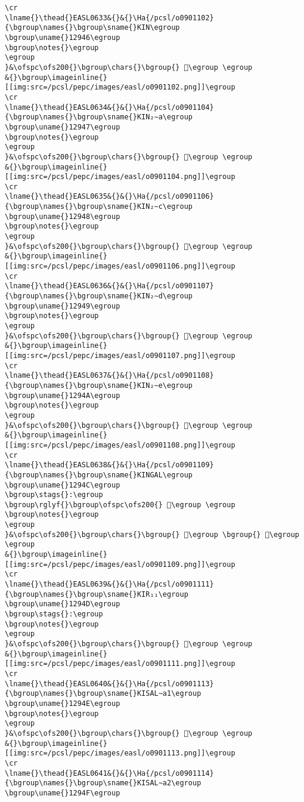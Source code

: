 \begin{verbatim}
\cr
\lname{}\thead{}EASL0633&{}&{}\Ha{/pcsl/o0901102}{\bgroup\names{}\bgroup\sname{}KIN\egroup
\bgroup\uname{}12946\egroup
\bgroup\notes{}\egroup
\egroup
}&\ofspc\ofs200{}\bgroup\chars{}\bgroup{} 𒥆\egroup \egroup
&{}\bgroup\imageinline{}[[img:src=/pcsl/pepc/images/easl/o0901102.png]]\egroup
\cr
\lname{}\thead{}EASL0634&{}&{}\Ha{/pcsl/o0901104}{\bgroup\names{}\bgroup\sname{}KIN₂∼a\egroup
\bgroup\uname{}12947\egroup
\bgroup\notes{}\egroup
\egroup
}&\ofspc\ofs200{}\bgroup\chars{}\bgroup{} 𒥇\egroup \egroup
&{}\bgroup\imageinline{}[[img:src=/pcsl/pepc/images/easl/o0901104.png]]\egroup
\cr
\lname{}\thead{}EASL0635&{}&{}\Ha{/pcsl/o0901106}{\bgroup\names{}\bgroup\sname{}KIN₂∼c\egroup
\bgroup\uname{}12948\egroup
\bgroup\notes{}\egroup
\egroup
}&\ofspc\ofs200{}\bgroup\chars{}\bgroup{} 𒥈\egroup \egroup
&{}\bgroup\imageinline{}[[img:src=/pcsl/pepc/images/easl/o0901106.png]]\egroup
\cr
\lname{}\thead{}EASL0636&{}&{}\Ha{/pcsl/o0901107}{\bgroup\names{}\bgroup\sname{}KIN₂∼d\egroup
\bgroup\uname{}12949\egroup
\bgroup\notes{}\egroup
\egroup
}&\ofspc\ofs200{}\bgroup\chars{}\bgroup{} 𒥉\egroup \egroup
&{}\bgroup\imageinline{}[[img:src=/pcsl/pepc/images/easl/o0901107.png]]\egroup
\cr
\lname{}\thead{}EASL0637&{}&{}\Ha{/pcsl/o0901108}{\bgroup\names{}\bgroup\sname{}KIN₂∼e\egroup
\bgroup\uname{}1294A\egroup
\bgroup\notes{}\egroup
\egroup
}&\ofspc\ofs200{}\bgroup\chars{}\bgroup{} 𒥊\egroup \egroup
&{}\bgroup\imageinline{}[[img:src=/pcsl/pepc/images/easl/o0901108.png]]\egroup
\cr
\lname{}\thead{}EASL0638&{}&{}\Ha{/pcsl/o0901109}{\bgroup\names{}\bgroup\sname{}KINGAL\egroup
\bgroup\uname{}1294C\egroup
\bgroup\stags{}:\egroup
\bgroup\rglyf{}\bgroup\ofspc\ofs200{} 𒥌\egroup \egroup
\bgroup\notes{}\egroup
\egroup
}&\ofspc\ofs200{}\bgroup\chars{}\bgroup{} 𒥋\egroup \bgroup{} 𒥌\egroup \egroup
&{}\bgroup\imageinline{}[[img:src=/pcsl/pepc/images/easl/o0901109.png]]\egroup
\cr
\lname{}\thead{}EASL0639&{}&{}\Ha{/pcsl/o0901111}{\bgroup\names{}\bgroup\sname{}KIR₁₁\egroup
\bgroup\uname{}1294D\egroup
\bgroup\stags{}:\egroup
\bgroup\notes{}\egroup
\egroup
}&\ofspc\ofs200{}\bgroup\chars{}\bgroup{} 𒥍\egroup \egroup
&{}\bgroup\imageinline{}[[img:src=/pcsl/pepc/images/easl/o0901111.png]]\egroup
\cr
\lname{}\thead{}EASL0640&{}&{}\Ha{/pcsl/o0901113}{\bgroup\names{}\bgroup\sname{}KISAL∼a1\egroup
\bgroup\uname{}1294E\egroup
\bgroup\notes{}\egroup
\egroup
}&\ofspc\ofs200{}\bgroup\chars{}\bgroup{} 𒥎\egroup \egroup
&{}\bgroup\imageinline{}[[img:src=/pcsl/pepc/images/easl/o0901113.png]]\egroup
\cr
\lname{}\thead{}EASL0641&{}&{}\Ha{/pcsl/o0901114}{\bgroup\names{}\bgroup\sname{}KISAL∼a2\egroup
\bgroup\uname{}1294F\egroup

\end{verbatim}
